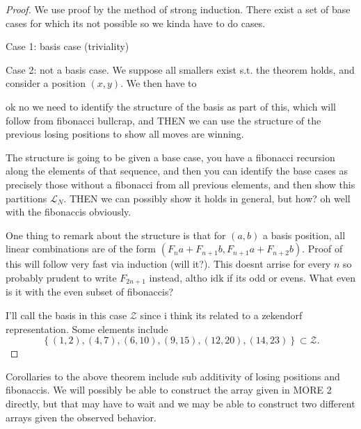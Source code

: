 \documentclass[11pt, letterpaper]{article}
\begin{document}
\begin{proof}
	We use proof by the method of strong induction. There exist a set of base cases for which its not possible so we kinda have to do cases.

	Case 1: basis case (triviality)

	Case 2: not a basis case. We suppose all smallers exist s.t. the theorem holds, and consider a position $(x,y)$. We then have to

	ok no we need to identify the structure of the basis as part of this, which will follow from fibonacci bullcrap, and THEN we can use the structure of the previous losing positions to show all moves are winning.

	The structure is going to be given a base case, you have a fibonacci recursion along the elements of that sequence, and then you can identify the base cases as precisely those without a fibonacci from all previous elements, and then show this partitions $\mathcal{L}_N$. THEN we can possibly show it holds in general, but how? oh well with the fibonaccis obviously.

	One thing to remark about the structure is that for $(a,b)$ a basis position, all linear combinations are of the form $(F_na+F_{n+1}b,F_{n+1}a+F_{n+2}b)$. Proof of this will follow very fast via induction (will it?). This doesnt arrise for every $n$ so probably prudent to write $F_{2n+1}$ instead, altho idk if its odd or evens. What even is it with the even subset of fibonaccis?

	I'll call the basis in this case $\mathcal{Z} $ since i think its related to a zekendorf representation. Some elements include
	\[
		\left\{ (1,2),(4,7),(6,10),(9,15),(12,20),(14,23) \right\} \subset \mathcal{Z} 
	.\]
	
\end{proof}

Corollaries to the above theorem include sub additivity of losing positions and fibonaccis. We will possibly be able to construct the array given in MORE 2 directly, but that may have to wait and we may be able to construct two different arrays given the observed behavior.


\end{document}

